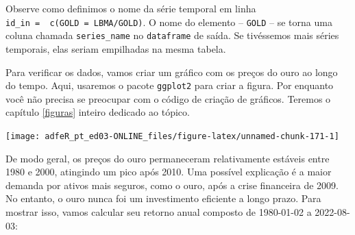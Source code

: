 \documentclass[
  11pt,
]{book}
\newenvironment{Shaded}{\begin{snugshade}}{\end{snugshade}}
\newcommand{\AttributeTok}[1]{\textcolor[rgb]{0.61,0.61,0.61}{#1}}
\newcommand{\CommentTok}[1]{\textcolor[rgb]{0.37,0.37,0.37}{\textit{#1}}}
\newcommand{\DecValTok}[1]{\textcolor[rgb]{0.06,0.06,0.06}{#1}}
\newcommand{\FunctionTok}[1]{\textcolor[rgb]{0,0,0}{#1}}
\newcommand{\NormalTok}[1]{#1}
\newcommand{\OtherTok}[1]{\textcolor[rgb]{0.37,0.37,0.37}{#1}}
\newcommand{\SpecialCharTok}[1]{\textcolor[rgb]{0,0,0}{#1}}
\newcommand{\StringTok}[1]{\textcolor[rgb]{0.5,0.5,0.5}{#1}}
\begin{document}
Observe como definimos o nome da série temporal em linha \texttt{id\_in\ =\ \ c(\textquotesingle{}GOLD\textquotesingle{}\ =\ \textquotesingle{}LBMA/GOLD\textquotesingle{})}. O nome do elemento -- \texttt{GOLD} -- se torna uma coluna chamada \texttt{series\_name} no \texttt{dataframe} de saída. Se tivéssemos mais séries temporais, elas seriam empilhadas na mesma tabela.

Para verificar os dados, vamos criar um gráfico com os preços do ouro ao longo do tempo. Aqui, usaremos o pacote \texttt{ggplot2} para criar a figura. Por enquanto você não precisa se preocupar com o código de criação de gráficos. Teremos o capítulo \ref{figuras} inteiro dedicado ao tópico.

\begin{center}\texttt{[image: adfeR\_pt\_ed03-ONLINE\_files/figure-latex/unnamed-chunk-171-1]} \end{center}

De modo geral, os preços do ouro permaneceram relativamente estáveis entre 1980 e 2000, atingindo um pico após 2010. Uma possível explicação é a maior demanda por ativos mais seguros, como o ouro, após a crise financeira de 2009. No entanto, o ouro nunca foi um investimento eficiente a longo prazo. Para mostrar isso, vamos calcular seu retorno anual composto de 1980-01-02 a 2022-08-03:

\begin{Shaded}
\end{Shaded}
\end{document}

